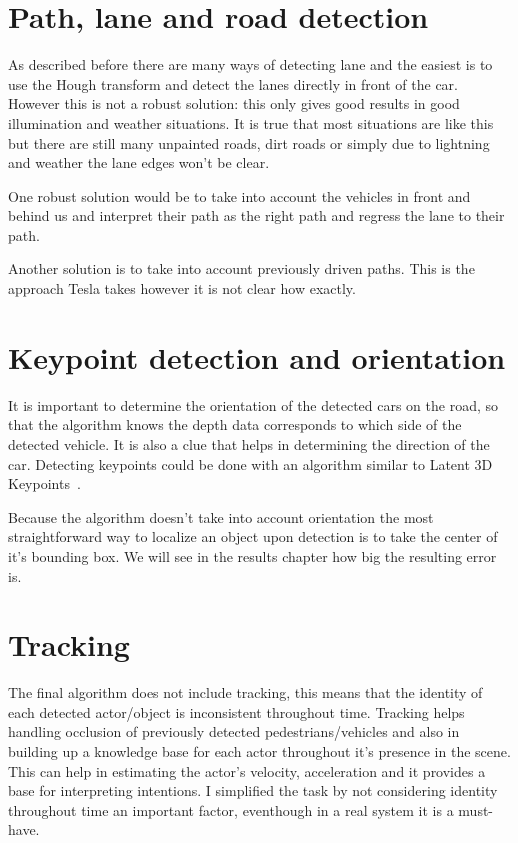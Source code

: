 \section{Path, lane and road detection}

As described before there are many ways of detecting lane and the easiest is to
use the Hough transform and detect the lanes directly in front of the car.
However this is not a robust solution: this only gives good results in good
illumination and weather situations. It is true that most situations are like
this but there are still many unpainted roads, dirt roads or simply due to
lightning and weather the lane edges won't be clear.

One robust solution would be to take into account the vehicles in front and
behind us and interpret their path as the right path and regress the lane to
their path. 

Another solution is to take into account previously driven paths. This is the
approach Tesla takes however it is not clear how exactly.

\section{Keypoint detection and orientation}

It is important to determine the orientation of the detected cars on the road,
so that the algorithm knows the depth data corresponds to which side of the
detected vehicle. It is also a clue that helps in determining the direction
of the car. Detecting keypoints could be done with an algorithm similar to Latent 3D
Keypoints~\cite{suwajanakorn_discovery_2018}.

Because the algorithm doesn't take into account orientation the most
straightforward way to localize an object upon detection is to take the center
of it's bounding box. We will see in the results chapter how big the resulting error is.

\section{Tracking}

The final algorithm does not include tracking, this means that the identity of
each detected actor/object is inconsistent throughout time. Tracking helps
handling occlusion of previously detected pedestrians/vehicles and also in
building up a knowledge base for each actor throughout it's presence in the
scene. This can help in estimating the actor's velocity, acceleration and it
provides a base for interpreting intentions. I simplified the task by not
considering identity throughout time an important factor, eventhough in a real
system it is a must-have.

